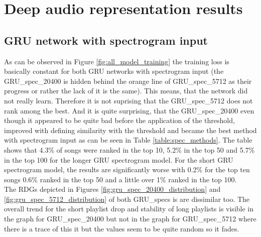 \section{Deep audio representation results}\label{sec:deep_audio_results}

\subsection{GRU network with spectrogram input}\label{ssec:gru_spec_results}

As can be observed in Figure \ref{fig:all_model_training} the training loss is basically constant for both GRU networks with spectrogram input (the GRU\_spec\_20400 is hidden behind the orange line of GRU\_spec\_5712 as their progress or rather the lack of it is the same). This means, that the network did not really learn. Therefore it is not suprising that the GRU\_spec\_5712 does not rank among the best. And it is quite surprising, that the GRU\_spec\_20400 even though it appeared to be quite bad before the application of the threshold, improved with defining similarity with the threshold and became the best method with spectrogram input as can be seen in Table \ref{table:spec_methods}. The table shows that 4.3\% of songs were ranked in the top 10, 5.2\% in the top 50 and 5.7\% in the top 100 for the longer GRU spectrogram model. For the short GRU spectrogram model, the results are significantly worse with 0.2\% for the top ten songs 0.6\% ranked in the top 50 and a little over 1\% ranked in the top 100. \\
The RDGs depicted in Figures \ref{fig:gru_spec_20400_distribution} and \ref{fig:gru_spec_5712_distribution} of both GRU\_specs is are dissimilar too. The overall trend for the short playlist drop and stability of long playlists is visible in the graph for GRU\_spec\_20400 but not in the graph for GRU\_spec\_5712 where there is a trace of this it but the values seem to be quite random so it fades. 

